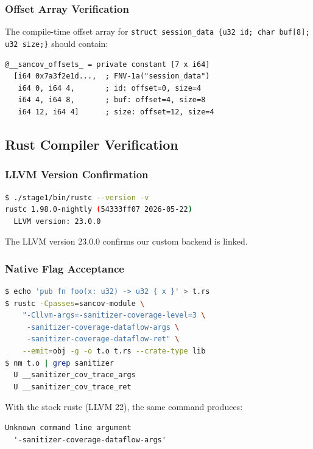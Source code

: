 \documentclass{ndss}
\begin{document}
\subsubsection{Offset Array Verification}

The compile-time offset array for \texttt{struct session\_data \{u32 id;
char buf[8]; u32 size;\}} should contain:
\begin{lstlisting}[numbers=none]
@__sancov_offsets_ = private constant [7 x i64]
  [i64 0x7a3f2e1d...,  ; FNV-1a("session_data")
   i64 0, i64 4,       ; id: offset=0, size=4
   i64 4, i64 8,       ; buf: offset=4, size=8
   i64 12, i64 4]      ; size: offset=12, size=4
\end{lstlisting}

\subsection{Rust Compiler Verification}

\subsubsection{LLVM Version Confirmation}

\begin{lstlisting}[language=bash,numbers=none]
$ ./stage1/bin/rustc --version -v
rustc 1.98.0-nightly (54333ff07 2026-05-22)
  LLVM version: 23.0.0
\end{lstlisting}

The LLVM version 23.0.0 confirms our custom backend is linked.

\subsubsection{Native Flag Acceptance}

\begin{lstlisting}[language=bash,numbers=none]
$ echo 'pub fn foo(x: u32) -> u32 { x }' > t.rs
$ rustc -Cpasses=sancov-module \
    "-Cllvm-args=-sanitizer-coverage-level=3 \
     -sanitizer-coverage-dataflow-args \
     -sanitizer-coverage-dataflow-ret" \
    --emit=obj -g -o t.o t.rs --crate-type lib
$ nm t.o | grep sanitizer
  U __sanitizer_cov_trace_args
  U __sanitizer_cov_trace_ret
\end{lstlisting}

With the stock rustc (LLVM 22), the same command produces:
\begin{lstlisting}[numbers=none]
Unknown command line argument
  '-sanitizer-coverage-dataflow-args'
\end{lstlisting}
\end{document}
